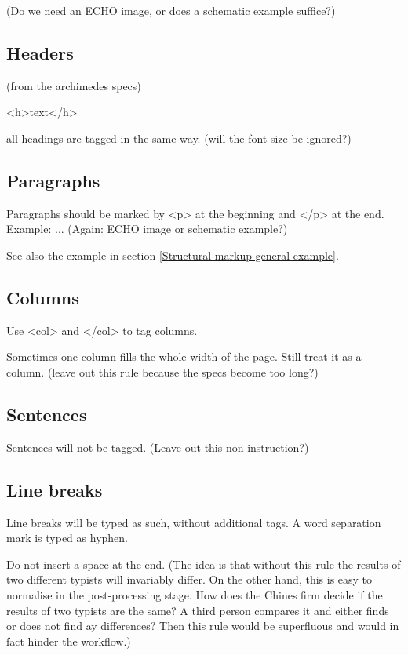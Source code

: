 (Do we need an ECHO image, or does a schematic example suffice?)

\subsection{Headers}

(from the archimedes specs)

<h>text</h>

all headings are tagged in the same way. (will the font size be ignored?)

\subsection{Paragraphs} 

Paragraphs should be marked by <p> at the beginning and </p> at the end. Example: ... (Again: ECHO image or schematic example?)


See also the example in section \ref{Structural markup general example}.

\subsection{Columns}

Use <col> and </col> to tag columns.


Sometimes one column fills the whole width of the page. Still treat it as a column. (leave out this rule because the specs become too long?)

\subsection{Sentences}

Sentences will not be tagged. (Leave out this non-instruction?)

\subsection{Line breaks}

Line breaks will be typed as such, without additional tags. A word separation mark is typed as hyphen. 

Do not insert a space at the end. (The idea is that without this rule the results of two different typists will invariably differ. On the other hand, this is easy to normalise in the post-processing stage. How does the Chines firm decide if the results of two typists are the same? A third person compares it and either finds or does not find ay differences? Then this rule would be superfluous and would in fact hinder the workflow.)

